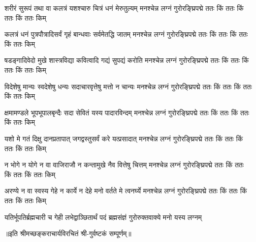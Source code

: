 

\fourlineindentedshloka
{शरीरं सुरूपं तथा वा कलत्रं}
{यशश्चारु चित्रं धनं मेरुतुल्यम्}
{मनश्चेन्न लग्नं गुरोरङ्घ्रिपद्मे}
{ततः किं ततः किं ततः किं ततः किम्}%
 

 \fourlineindentedshloka
{कलत्रं धनं पुत्रपौत्रादिसर्वं}
{गृहं बान्धवाः सर्वमेतद्धि जातम्}
{मनश्चेन्न लग्नं गुरोरङ्घ्रिपद्मे}
{ततः किं ततः किं ततः किं ततः किम्}%
 

\fourlineindentedshloka 
{षडङ्गादिवेदो मुखे शास्त्रविद्या}
{कवित्वादि गद्यं सुपद्यं करोति}
{मनश्चेन्न लग्नं गुरोरङ्घ्रिपद्मे}
{ततः किं ततः किं ततः किं ततः किम्}%
 

\fourlineindentedshloka 
{विदेशेषु मान्यः स्वदेशेषु धन्यः}
{सदाचारवृत्तेषु मत्तो न चान्यः}
{मनश्चेन्न लग्नं गुरोरङ्घ्रिपद्मे}
{ततः किं ततः किं ततः किं ततः किम्}%
 

\fourlineindentedshloka 
{क्षमामण्डले भूपभूपालबृन्दैः}
{सदा सेवितं यस्य पादारविन्दम्}
{मनश्चेन्न लग्नं गुरोरङ्घ्रिपद्मे}
{ततः किं ततः किं ततः किं ततः किम्}%
 
\fourlineindentedshloka 
{यशो मे गतं दिक्षु दानप्रतापात्}
{जगद्वस्तुसर्वं करे यत्प्रसादात्}
{मनश्चेन्न लग्नं गुरोरङ्घ्रिपद्मे}
{ततः किं ततः किं ततः किं ततः किम्}%
 
\fourlineindentedshloka 
{न भोगे न योगे न वा वाजिराजौ}
{न कन्तामुखे नैव वित्तेषु चित्तम्}
{मनश्चेन्न लग्नं गुरोरङ्घ्रिपद्मे}
{ततः किं ततः किं ततः किं ततः किम्}%
 

\fourlineindentedshloka 
{अरण्ये न वा स्वस्य गेहे न कार्ये}
{न देहे मनो वर्तते मे त्वनर्घ्ये}
{मनश्चेन्न लग्नं गुरोरङ्घ्रिपद्मे}
{ततः किं ततः किं ततः किं ततः किम्}%
 

{यतिर्भूपतिर्ब्रह्मचारी च गेही}
{लभेद्वाञ्छितार्थं पदं ब्रह्मसंज्ञं}
{गुरोरुक्तवाक्ये मनो यस्य लग्नम्}%
 

॥इति श्रीमच्छङ्कराचार्यविरचितं श्री-गुर्वष्टकं सम्पूर्णम्॥